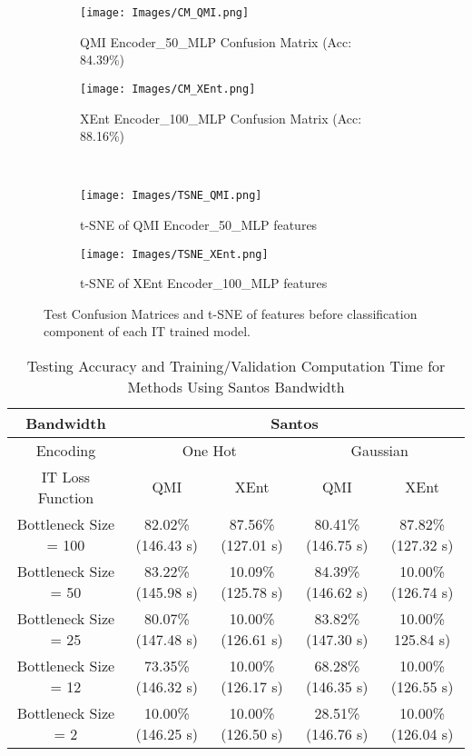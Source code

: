 \documentclass[conference]{IEEEtran}
\begin{document}
\begin{figure*}[htb!]
	\begin{subfigure}{.49\textwidth}{
			\texttt{[image: Images/CM\_QMI.png]}
			\caption{QMI Encoder\_50\_MLP Confusion Matrix (Acc: 84.39\%)}
			\label{fig:CM_QMI}
		}
	\end{subfigure}
	\begin{subfigure}{.49\textwidth}{
			\texttt{[image: Images/CM\_XEnt.png]}
			\caption{XEnt Encoder\_100\_MLP Confusion Matrix (Acc: 88.16\%)}
			\label{fig:CM_XEnt}
		}
	\end{subfigure}
	~
	\begin{subfigure}{.49\textwidth}{
			\texttt{[image: Images/TSNE\_QMI.png]}
			\caption{t-SNE of QMI Encoder\_50\_MLP features}
			\label{fig:TSNE_QMI}
		}
	\end{subfigure}
	\begin{subfigure}{.49\textwidth}{
			\texttt{[image: Images/TSNE\_XEnt.png]}
			\caption{t-SNE of XEnt Encoder\_100\_MLP features}
			\label{fig:TSNE_XEnt}
		}
	\end{subfigure}
	
	\caption{Test Confusion Matrices and t-SNE of features before classification component of each IT trained model.}
	\centering
	\label{fig:IT_results}
\end{figure*}

\begin{table*}[htb!]
	\centering
	\caption{Testing Accuracy and Training/Validation Computation Time for Methods Using Santos Bandwidth}
	\begin{tabular}{|c|c|c|c|c|}
		\hline
		Bandwidth             & \multicolumn{4}{c|}{Santos}                                                       \\ \hline
		Encoding              & \multicolumn{2}{c|}{One Hot}            & \multicolumn{2}{c|}{Gaussian}           \\ \hline
		IT Loss Function      & QMI                & XEnt               & QMI               & XEnt                \\ \hline
		Bottleneck Size = 100 & 82.02\% (146.43 s) & 87.56\% (127.01 s) & 80.41\% (146.75 s) & 87.82\% (127.32 s) \\ \hline
		Bottleneck Size = 50  & 83.22\% (145.98 s) & 10.09\% (125.78 s) & 84.39\% (146.62 s) & 10.00\% (126.74 s) \\ \hline
		Bottleneck Size = 25  & 80.07\% (147.48 s) & 10.00\% (126.61 s) & 83.82\% (147.30 s) & 10.00\% 125.84 s)  \\ \hline
		Bottleneck Size = 12  & 73.35\% (146.32 s) & 10.00\% (126.17 s) & 68.28\% (146.35 s) & 10.00\% (126.55 s) \\ \hline
		Bottleneck Size = 2   & 10.00\% (146.25 s) & 10.00\% (126.50 s) & 28.51\% (146.76 s) & 10.00\% (126.04 s) \\ \hline
	\end{tabular}
	\label{tab:Method2}
\end{table*}
\end{document}
